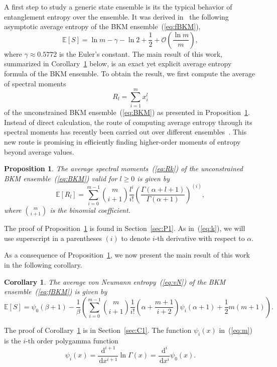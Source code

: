 \documentclass[pdflatex,sn-mathphys-num]{sn-jnl}%
\theoremstyle{thmstyleone}
\newtheorem{proposition}{Proposition}
\newtheorem{corollary}{Corollary}
\newcommand{\dd}{\,\mathrm{d}}
\begin{document}
A first step to study a generic state ensemble is its the typical behavior of entanglement entropy over the ensemble. It was derived in~\cite{Miller25} the following asymptotic average entropy of the BKM ensemble~(\ref{eq:fBKM}),
\begin{equation}\label{eq:asy}
\mathbb{E}\left[S\right]=\ln m-\gamma-\ln2+\frac{1}{2}+\mathcal{O}\left(\frac{\ln m}{m}\right),
\end{equation}
where $\gamma\approx0.5772$ is the Euler's constant. The main result of this work, summarized in Corollary~\ref{main:m} below, is an exact yet explicit average entropy formula of the BKM ensemble. To obtain the result, we first compute the average of spectral moments
\begin{equation}\label{eq:Rk}
R_{l}=\sum_{i=1}^{m}x_{i}^{l}
\end{equation}
of the unconstrained BKM ensemble~(\ref{eq:BKM}) as presented in Proposition~\ref{main:k}. Instead of direct calculation, the route of computing average entropy through its spectral moments has recently been carried out over different ensembles~\cite{HW25,WHW25}. This new route is promising in efficiently finding higher-order moments of entropy beyond average values.
\begin{proposition}\label{main:k}
The average spectral moments~(\ref{eq:Rk}) of the unconstrained BKM ensemble~(\ref{eq:BKM}) valid for $l\geq0$ is given by
\begin{equation}\label{eq:k}
\mathbb{E}\left[R_{l}\right]=\sum_{i=0}^{m-1}\binom{m}{i+1}\frac{l^{i}}{i!}\left(\frac{\Gamma(\alpha+l+1)}{\Gamma(\alpha+1)}\right)^{(i)},
\end{equation}
where $\binom{m}{i+1}$ is the binomial coefficient.
\end{proposition}
The proof of Proposition~\ref{main:k} is found in Section~\ref{sec:P1}. As in~(\ref{eq:k}), we will use superscript in a parentheses $(i)$ to denote $i$-th derivative with respect to $\alpha$.

As a consequence of Proposition~\ref{main:k}, we now present the main result of this work in the following corollary.
\begin{corollary}\label{main:m}
The average von Neumann entropy~(\ref{eq:vN}) of the BKM ensemble~(\ref{eq:fBKM}) is given by
\begin{equation}\label{eq:m}
\mathbb{E}\left[S\right]=\psi_{0}(\beta+1)-\frac{1}{\beta}\left(\sum_{i=0}^{m-1}\binom{m}{i+1}\frac{1}{i!}\left(\alpha+\frac{m+1}{i+2}\right)\psi_{i}(\alpha+1)+\frac{1}{2}m(m+1)\right).
\end{equation}
\end{corollary}
The proof of Corollary~\ref{main:m} is in Section~\ref{sec:C1}. The function $\psi_{i}(x)$ in~(\ref{eq:m}) is the $i$-th order polygamma function~\cite{Brychkov}
\begin{equation}\label{eq:polygamma}
\psi_{i}(x)=\frac{\dd^{i+1}}{\dd x^{i+1}}\ln\Gamma(x)=\frac{\dd^{i}}{\dd x^{i}}\psi_{0}(x).
\end{equation}
\end{document}
